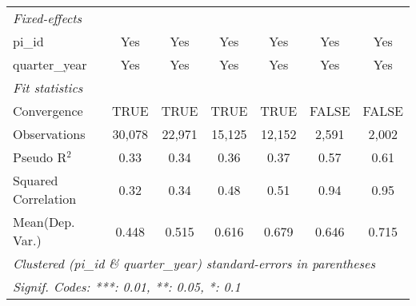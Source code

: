 \begin{tabular}{lcccccc}
   \midrule
   \emph{Fixed-effects}\\
   pi\_id                                                     & Yes           & Yes           & Yes           & Yes           & Yes           & Yes\\  
   quarter\_year                                              & Yes           & Yes           & Yes           & Yes           & Yes           & Yes\\  
   \midrule
   \emph{Fit statistics}\\
   Convergence                                                &TRUE           & TRUE          & TRUE          & TRUE          & FALSE         & FALSE\\  
   Observations                                               & 30,078        & 22,971        & 15,125        & 12,152        & 2,591         & 2,002\\  
   Pseudo R$^2$                                               & 0.33          & 0.34          & 0.36          & 0.37          & 0.57          & 0.61\\  
   Squared Correlation                                        & 0.32          & 0.34          & 0.48          & 0.51          & 0.94          & 0.95\\  
Mean(Dep. Var.) & 0.448 & 0.515 & 0.616 & 0.679 & 0.646 & 0.715 \\
   \midrule \midrule
   \multicolumn{7}{l}{\emph{Clustered (pi\_id \& quarter\_year) standard-errors in parentheses}}\\
   \multicolumn{7}{l}{\emph{Signif. Codes: ***: 0.01, **: 0.05, *: 0.1}}\\
\end{tabular}
\par\endgroup
